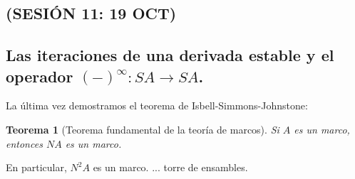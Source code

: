 \documentclass[12pt,letterpaper,titlepage]{article}
\newtheorem*{thm}{Teorema}
\theoremstyle{definition}
\newcommand\tps[1]{\texorpdfstring{#1}{}}
\newcommand\<{\langle}
\renewcommand\>{\rangle}
\begin{document}
\subsection*{(SESIÓN 11: 19 OCT)}

\subsection{Las iteraciones de una derivada estable y el operador \tps{$(-)^\infty:SA\to SA$}.}

La última vez demostramos el teorema de Isbell-Simmons-Johnstone:

\begin{thm}[Teorema fundamental de la teoría de marcos]
  Si $A$ es un marco, entonces $NA$ es un marco.
\end{thm}

En particular, $N^2A$ es un marco.
... torre de ensambles.
\end{document}
